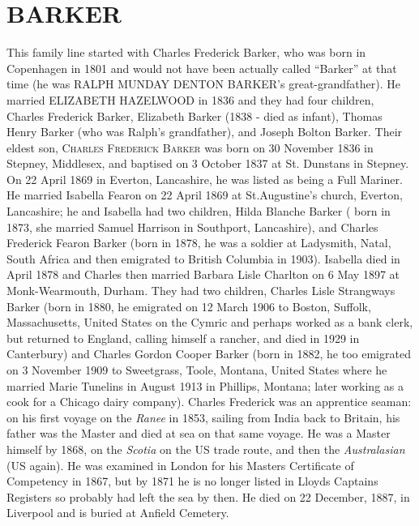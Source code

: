 \section{BARKER}

This family line started with Charles Frederick Barker, who was born in Copenhagen in 1801 and would not have been actually called ``Barker'' at that time (he was \uppercase{Ralph Munday Denton Barker}'s great-grandfather). He married  \uppercase{Elizabeth Hazelwood} in 1836 and they had four children,  Charles Frederick Barker, Elizabeth Barker (1838 - died as infant), Thomas Henry Barker (who was Ralph's grandfather), and Joseph Bolton Barker.
Their eldest son,  \textsc{Charles Frederick Barker} was born on 30 November 1836 in Stepney, Middlesex, and baptised on 3 October 1837 at St. Dunstans in Stepney. On 22 April 1869 in Everton, Lancashire, he was listed as being a Full Mariner. He married Isabella Fearon on 22 April 1869 at St.Augustine's church,	Everton, Lancashire; he and Isabella had two children, Hilda Blanche Barker ( born in 1873, she married Samuel Harrison in Southport, Lancashire), and Charles Frederick Fearon Barker (born in 1878, he was a soldier at Ladysmith, Natal, South Africa and then emigrated to British Columbia in 1903). Isabella died in April 1878 and Charles then married Barbara Lisle Charlton on 6 May 1897 at Monk-Wearmouth, Durham. They had two children, Charles Lisle Strangways Barker (born in 1880, he emigrated on 12 March 1906 to	Boston, Suffolk, Massachusetts, United States on the Cymric and perhaps worked as a bank clerk, but returned to England, calling himself a rancher, and died in 1929 in Canterbury) and Charles Gordon Cooper Barker (born in 1882, he too emigrated on 3 November 1909 to	Sweetgrass, Toole, Montana, United States where he married Marie Tunelins in August 1913 in Phillips, Montana; later working as a cook for a Chicago dairy company).
Charles Frederick was an apprentice seaman: on his first voyage on the \textit{Ranee} in 1853, sailing from India back to Britain, his father was the Master and died at sea on that same voyage. He was a Master himself by 1868, on the \textit{Scotia} on the US trade route, and then the \textit{Australasian} (US again). He was examined in London for his Masters Certificate of Competency in 1867, but by 1871 he is no longer listed in Lloyds Captains Registers so probably had left the sea by then. He died on 22 December, 1887,  in Liverpool and is buried at Anfield Cemetery.
